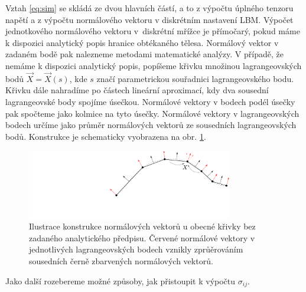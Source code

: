 Vztah \eqref{eq:sim} se skládá ze dvou hlavních částí, a to z výpočtu úplného tenzoru napětí a z výpočtu normálového vektoru v diskrétním nastavení LBM. Výpočet jednotkového normálového vektoru v~diskrétní mřížce je přímočarý, pokud máme k dispozici analytický popis hranice obtékaného tělesa. Normálový vektor v zadaném bodě pak nalezneme metodami matematické analýzy. V případě, že nemáme k dispozici analytický popis, popíšeme křivku množinou lagrangeovských bodů $ \vec{X} = \vec{X} (s) $, kde $ s $ značí parametrickou souřadnici lagrangeovského bodu. Křivku dále nahradíme po částech lineární aproximací, kdy dva sousední lagrangeovské body spojíme úsečkou. Normálové vektory v bodech podél úsečky pak spočteme jako kolmice na tyto úsečky. Normálové vektory v lagrangeovských bodech určíme jako průměr normálových vektorů ze sousedních lagrangeovských bodů. Konstrukce je schematicky vyobrazena na obr. \ref{fig:curve}.

\begin{figure}[h]
	\centering
	\vspace{2.8mm}
	\includegraphics[width=0.8\textwidth, trim={7.9cm 1.6cm 0cm 0cm}]{Images/lincurve.pdf}
	\vspace{1.8mm}
	\caption{Ilustrace konstrukce normálových vektorů u obecné křivky bez zadaného analytického předpisu. Červené normálové vektory v jednotlivých lagrangeovských bodech vznikly zprůěrováním sousedních černě zbarvených normálových vektorů.}
	\label{fig:curve}
	\vspace{0mm}
\end{figure}
Jako další rozebereme možné způsoby, jak přistoupit k výpočtu  $ \sigma_{ij} $.


